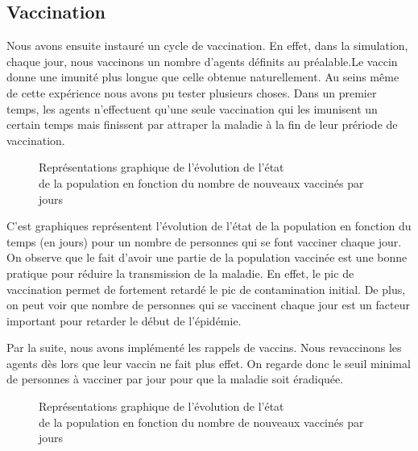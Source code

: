 \documentclass[a4paper, 12pt]{report}
\begin{document}
\newpage

\subsection{Vaccination}

Nous avons ensuite instauré un cycle de vaccination. En effet, dans la simulation, chaque jour, nous vaccinons un nombre d'agents définits au préalable.Le vaccin donne une imunité plus longue que celle obtenue
naturellement. Au seins même de cette expérience nous avons pu tester plusieurs choses. Dans un premier temps, les agents n'effectuent qu'une seule vaccination qui les imunisent un certain temps mais finissent
par attraper la maladie à la fin de leur prériode de vaccination.

\begin{figure}[h]
	\centering
	\qquad
	\centering
	\qquad
	\caption{Représentations graphique de l'évolution de l'état\\ de la population en fonction du nombre de nouveaux vaccinés par jours}

\end{figure}

C'est graphiques représentent l'évolution de l'état de la population en fonction du temps (en jours) pour un nombre de personnes qui se font vacciner chaque jour.
On observe que le fait d'avoir une partie de la population vaccinée est une bonne pratique pour réduire la transmission de la maladie. En effet, le pic de vaccination permet de
fortement retardé le pic de contamination initial.
\newpage
De plus, on peut voir que nombre de personnes qui se vaccinent chaque jour est un facteur important pour retarder le début de l'épidémie.

Par la suite, nous avons implémenté les rappels de vaccins. Nous revaccinons les agents dès lors que leur vaccin ne fait plus effet. On regarde donc le seuil minimal de personnes à vacciner par jour
pour que la maladie soit éradiquée.

\begin{figure}[h]
	\centering
	\qquad
	\centering
	\qquad
	\caption{Représentations graphique de l'évolution de l'état\\ de la population en fonction du nombre de nouveaux vaccinés par jours}

\end{figure}
\end{document}
